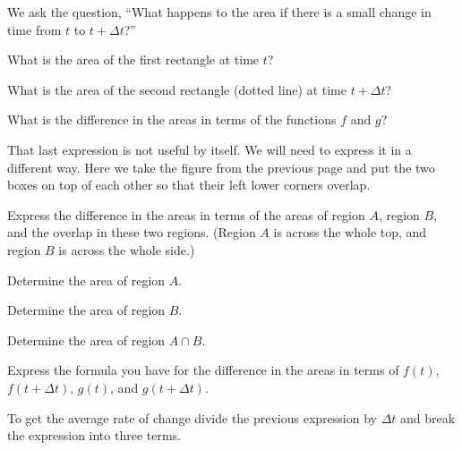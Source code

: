 \begin{problem}
  We ask the question, ``What happens to the area if there is a small
  change in time from $t$ to $t+\Delta t$?''

  \scalebox{0.55}{}

  \begin{subproblem}
  \item What is the area of the first rectangle at time $t$?
    \vfill
  \item What is the area of the second rectangle (dotted line) at time $t+\Delta t$?
    \vfill
  \item What is the difference in the areas in terms of the functions
    $f$ and $g$?
    \vfill
  \end{subproblem}

  \clearpage

\item That last expression is not useful by itself. We will need to
  express it in a different way. Here we take the figure from the
  previous page and put the two boxes on top of each other so that
  their left lower corners overlap.

  \scalebox{0.55}{}

  \begin{subproblem}
    \item Express the difference in the areas in terms of the areas of
      region $A$, region $B$, and the overlap in these two
      regions. (Region $A$ is across the whole top, and region $B$ is
      across the whole side.)
      \vfill

    \item Determine the area of region $A$.
      \vfill

    \item Determine the area of region $B$.
      \vfill

    \item Determine the area of region $A\cap B$.
      \vfill

    \clearpage

    \item Express the formula you have for the difference in the areas
      in terms of $f(t)$, $f(t+\Delta t)$, $g(t)$, and $g(t+\Delta t)$.
      \vfill

    \item To get the average rate of change divide the previous
      expression by $\Delta t$ and break the expression into three terms.


\end{subproblem}
\end{problem}
